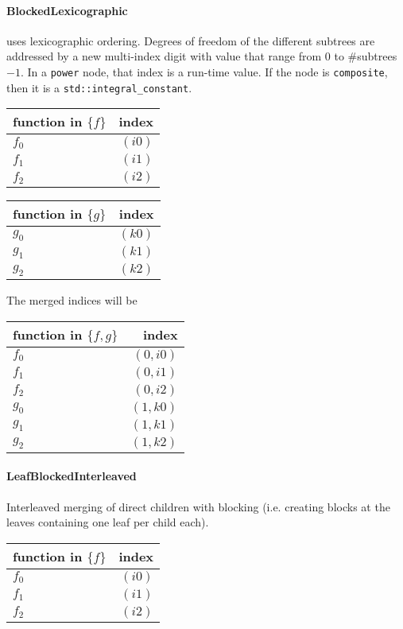 \documentclass[a4paper,10pt,headings=normal,bibliography=totoc]{scrartcl}
\newcommand{\cpp}[1]{\lstinline[basicstyle=\ttfamily]!#1!}
\begin{document}
\paragraph{BlockedLexicographic}
uses lexicographic ordering.  Degrees of freedom of the different subtrees are addressed
by a new multi-index digit with value that range from 0 to \#subtrees$-1$.
In a \cpp{power} node, that index is a run-time value.  If the node is \cpp{composite},
then it is a \cpp{std::integral_constant}.


\begin{tabular}{l|r}
   function in $\{f\}$ & index \\
   \hline
   $f_0$  & $(i0)$ \\
   $f_1$  & $(i1)$ \\
   $f_2$  & $(i2)$
\end{tabular}

\begin{tabular}{l|r}
   function in $\{g\}$ & index \\
   \hline
   $g_0$  & $(k0)$ \\
   $g_1$  & $(k1)$ \\
   $g_2$  & $(k2)$
\end{tabular}

The merged indices will be

\begin{tabular}{l|r}
   function in $\{f,g\}$ & index \\
   \hline
   $f_0$  & $(0,i0)$ \\
   $f_1$  & $(0,i1)$ \\
   $f_2$  & $(0,i2)$ \\
   $g_0$  & $(1,k0)$ \\
   $g_1$  & $(1,k1)$ \\
   $g_2$  & $(1,k2)$
\end{tabular}

\paragraph{LeafBlockedInterleaved}
Interleaved merging of direct children with blocking (i.e. creating blocks at the leaves containing one leaf per child each).

\begin{tabular}{l|r}
   function in $\{f\}$ & index \\
   \hline
   $f_0$  & $(i0)$ \\
   $f_1$  & $(i1)$ \\
   $f_2$  & $(i2)$
\end{tabular}
\end{document}
